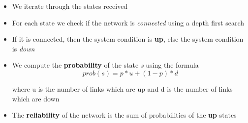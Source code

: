 \documentclass[12pt,letterpaper,titlepage,en-US]{article}
\begin{document}
\begin{itemize}


\item We iterate through the states received

 \item For each state we check if the network is \textit{connected} using a depth first search
 
 \item  If it is connected, then the system condition is \textbf{up}, else the system condition is \textit{down}

\item We compute the \textbf{probability} of the state \textit{s} using the formula
\begin{equation}
prob(s)=p*u + (1-p)*d
\end{equation}

where u is the number of links which are up and d is the number of links which are down

\item The \textbf{reliability} of the network is the sum of probabilities of the \textbf{up} states
 
\end{itemize}
\end{document}
